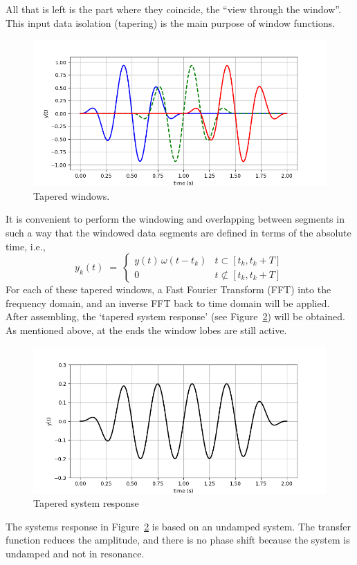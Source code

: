 All that is left is the part where they coincide,
the ``view through the window''.
This input data isolation (tapering) is the main purpose of window functions.
%
\begin{figure}[tb]
\includegraphics[width=\textwidth]{Figures/tapered}
\caption{Tapered windows.}
\label{fig:Tapered data}
\end{figure}

It is convenient to perform the windowing and overlapping between segments in
such a way that the windowed data segments are defined in terms of the
absolute time, i.e.,
%
\begin{equation}
\label{eq:wind}
y_k(t) \;=\:
\begin{cases}
y(t)\,\omega(t-t_k) & t\subset\left[t_k,t_k+T\right] \\
      0             & t\not\subset\left[t_k,t_k+T\right]
\end{cases}
\end{equation}
%
For each of these tapered windows, a Fast Fourier Transform (FFT) into the
frequency domain, and an inverse FFT back to time domain will be applied.
After assembling, the `tapered system response'
(see Figure~\ref{fig:Tapered system response}) will be obtained.
As mentioned above, at the ends the window lobes are still active.
%
\begin{figure}[tb]
\includegraphics[width=\textwidth]{Figures/response}
\caption{Tapered system response}
\label{fig:Tapered system response}
\end{figure}
%
The systems response in Figure~\ref{fig:Tapered system response}
is based on an undamped system.
The transfer function reduces the amplitude, and there is no phase shift
because the system is undamped and not in resonance.

